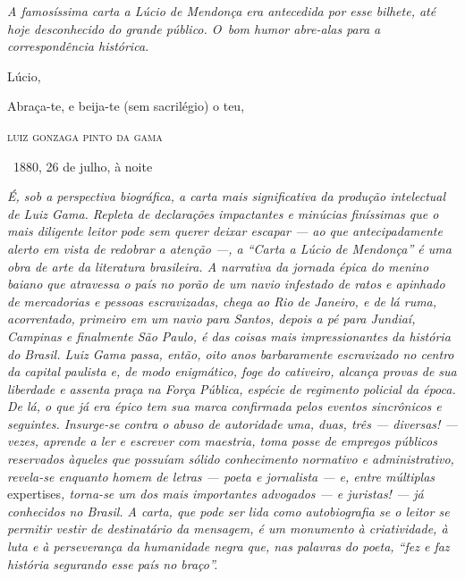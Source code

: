 
\begin{resumo}
\emph{A famosíssima carta a Lúcio de Mendonça era antecedida por esse
bilhete, até hoje desconhecido do grande público. O~bom humor abre-alas
para a correspondência histórica. }
\end{resumo}


Lúcio,

Abraça-te, e beija-te (sem sacrilégio) o teu,\medskip

\hfill\textsc{luiz gonzaga pinto da gama}

\hfill\ 1880, 26 de julho, à noite


\begin{resumo}
\emph{É, sob a perspectiva biográfica, a carta mais significativa da
produção intelectual de Luiz Gama. Repleta de declarações impactantes e
minúcias finíssimas que o mais diligente leitor pode sem querer deixar
escapar --- ao que antecipadamente alerto em vista de redobrar a atenção
---, a ``Carta a Lúcio de Mendonça'' é uma obra de arte da literatura
brasileira. A narrativa da jornada épica do menino baiano que atravessa
o país no porão de um navio infestado de ratos e apinhado de mercadorias
e pessoas escravizadas, chega ao Rio de Janeiro, e de lá ruma,
acorrentado, primeiro em um navio para Santos, depois a pé para Jundiaí,
Campinas e finalmente São Paulo, é das coisas mais impressionantes da
história do Brasil. Luiz Gama passa, então, oito anos barbaramente
escravizado no centro da capital paulista e, de modo enigmático, foge do
cativeiro, alcança provas de sua liberdade e assenta praça na Força
Pública, espécie de regimento policial da época. De lá, o que já era
épico tem sua marca confirmada pelos eventos sincrônicos e seguintes.
Insurge-se contra o abuso de autoridade uma, duas, três --- diversas! ---
vezes, aprende a ler e escrever com maestria, toma posse de empregos
públicos reservados àqueles que possuíam sólido conhecimento normativo e
administrativo, revela-se enquanto homem de letras --- poeta e jornalista
--- e, entre múltiplas} expertises\emph{, torna-se um dos mais importantes
advogados --- e juristas! --- já conhecidos no Brasil. A carta, que pode
ser lida como autobiografia se o leitor se permitir vestir de
destinatário da mensagem, é um monumento à criatividade, à luta e à
perseverança da humanidade negra que, nas palavras do poeta, ``fez e faz
história segurando esse país no braço''. }
\end{resumo}\pagebreak


